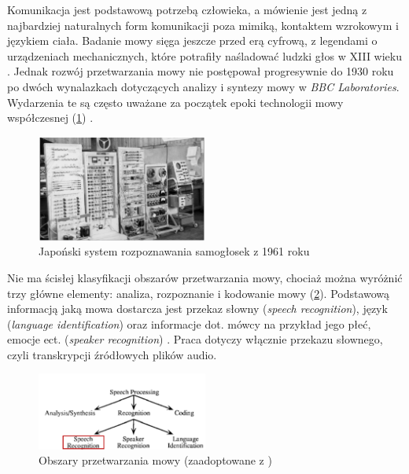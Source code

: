 Komunikacja jest podstawową potrzebą człowieka, a mówienie jest jedną z najbardziej naturalnych form komunikacji poza mimiką, kontaktem wzrokowym i językiem ciała. Badanie mowy sięga jeszcze przed erą cyfrową, z legendami o urządzeniach mechanicznych, które potrafiły naśladować ludzki głos w XIII wieku \cite{introduction_springer}. Jednak rozwój przetwarzania mowy nie postępował progresywnie do 1930 roku po dwóch wynalazkach dotyczących analizy i syntezy mowy w \textit{BBC Laboratories}. Wydarzenia te są często uważane za początek epoki technologii mowy współczesnej (\ref{fig:research_lab}) \cite{introduction_speech_signals}.
\begin{figure}[h]
    \centering
    \includegraphics[width=0.5\textwidth]{images/research_lab.png}
    \caption{Japoński system rozpoznawania samogłosek z 1961 roku \cite{img_research_lab}}
    \label{fig:research_lab}
\end{figure}

Nie ma ścisłej klasyfikacji obszarów przetwarzania mowy, chociaż można wyróżnić trzy główne elementy: analiza, rozpoznanie i kodowanie mowy (\ref{fig:speech_domains}). Podstawową informacją jaką mowa dostarcza jest przekaz słowny (\textit{speech recognition}), język (\textit{language identification}) oraz informacje dot. mówcy na przykład jego płeć, emocje ect. (\textit{speaker recognition})  \cite{introduction_springer}. Praca dotyczy włącznie przekazu słownego, czyli transkrypcji źródłowych plików audio.
\begin{figure}[h]
    \centering
    \includegraphics[width=0.5\textwidth]{images/speech_domains.png}
    \caption{Obszary przetwarzania mowy (zaadoptowane z \cite{img_speech_domains})}
    \label{fig:speech_domains}
\end{figure}

